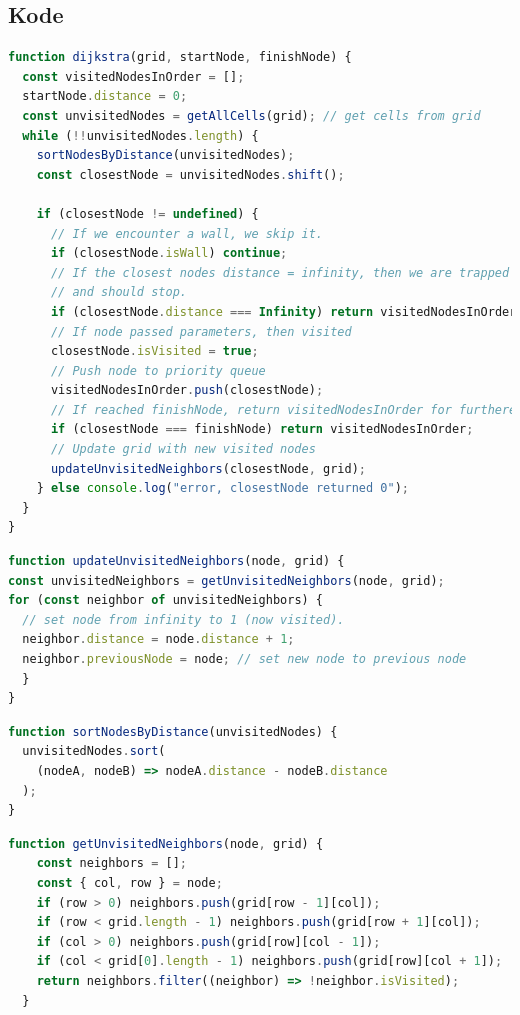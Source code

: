 \documentclass[12pt]{article}
\begin{document}
\subsection{Kode}
\begin{lstlisting}[language=JavaScript, caption=Kode for Dijkstra's Algoritme, label={lst:Dijkstra}]
function dijkstra(grid, startNode, finishNode) {
  const visitedNodesInOrder = [];
  startNode.distance = 0;
  const unvisitedNodes = getAllCells(grid); // get cells from grid
  while (!!unvisitedNodes.length) {
    sortNodesByDistance(unvisitedNodes);
    const closestNode = unvisitedNodes.shift();

    if (closestNode != undefined) {
      // If we encounter a wall, we skip it.
      if (closestNode.isWall) continue;
      // If the closest nodes distance = infinity, then we are trapped 
      // and should stop.
      if (closestNode.distance === Infinity) return visitedNodesInOrder;
      // If node passed parameters, then visited
      closestNode.isVisited = true; 
      // Push node to priority queue
      visitedNodesInOrder.push(closestNode);
      // If reached finishNode, return visitedNodesInOrder for furthere use.
      if (closestNode === finishNode) return visitedNodesInOrder;
      // Update grid with new visited nodes
      updateUnvisitedNeighbors(closestNode, grid); 
    } else console.log("error, closestNode returned 0");
  }
}
\end{lstlisting}
\begin{lstlisting}[language=JavaScript, caption=Kode for opdatering af unvisitedNodes]
function updateUnvisitedNeighbors(node, grid) {
const unvisitedNeighbors = getUnvisitedNeighbors(node, grid);
for (const neighbor of unvisitedNeighbors) {
  // set node from infinity to 1 (now visited).
  neighbor.distance = node.distance + 1;
  neighbor.previousNode = node; // set new node to previous node
  }
}
\end{lstlisting}
\begin{lstlisting}[language=JavaScript, caption=Kode for finde tætteste nodes]
  function sortNodesByDistance(unvisitedNodes) {
  unvisitedNodes.sort(
    (nodeA, nodeB) => nodeA.distance - nodeB.distance
  );
}
\end{lstlisting}
\begin{lstlisting}[language=JavaScript, caption=Kode for at søge nye nodes]
  function getUnvisitedNeighbors(node, grid) {
    const neighbors = [];
    const { col, row } = node;
    if (row > 0) neighbors.push(grid[row - 1][col]);
    if (row < grid.length - 1) neighbors.push(grid[row + 1][col]);
    if (col > 0) neighbors.push(grid[row][col - 1]);
    if (col < grid[0].length - 1) neighbors.push(grid[row][col + 1]);
    return neighbors.filter((neighbor) => !neighbor.isVisited);
  }
  
\end{lstlisting}
\end{document}
